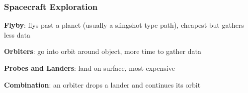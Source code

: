 \subsubsection{Spacecraft Exploration}
\textbf{Flyby}: flys past a planet (usually a slingshot type path), cheapest but gathers less data

\textbf{Orbiters}: go into orbit around object, more time to gather data

\textbf{Probes and Landers}: land on surface, most expensive

\textbf{Combination}: an orbiter drops a lander and continues its orbit
